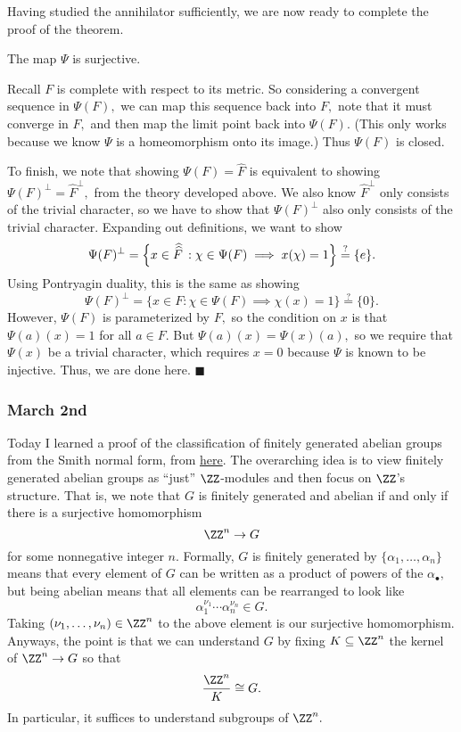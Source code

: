Having studied the annihilator sufficiently, we are now ready to complete the proof of the theorem.
\begin{lemma}
    The map $\Psi$ is surjective.
\end{lemma}
Recall $F$ is complete with respect to its metric. So considering a convergent sequence in $\Psi(F),$ we can map this sequence back into $F,$ note that it must converge in $F,$ and then map the limit point back into $\Psi(F).$ (This only works because we know $\Psi$ is a homeomorphism onto its image.) Thus $\Psi(F)$ is closed.

To finish, we note that showing $\Psi(F)=\widehat F$ is equivalent to showing $\Psi(F)^\perp=\widehat F^\perp,$ from the theory developed above. We also know $\widehat F^\perp$ only consists of the trivial character, so we have to show that $\Psi(F)^\perp$ also only consists of the trivial character. Expanding out definitions, we want to show
\[\Psi(F)^\perp=\Big\{x\in\widehat{\smash{\widehat F}\vphantom{1^]}\,}:\chi\in\Psi(F)\implies x(\chi)=1\Big\}\stackrel?=\{e\}.\]
Using Pontryagin duality, this is the same as showing
\[\Psi(F)^\perp=\{x\in F:\chi\in\Psi(F)\implies\chi(x)=1\}\stackrel?=\{0\}.\]
However, $\Psi(F)$ is parameterized by $F,$ so the condition on $x$ is that $\Psi(a)(x)=1$ for all $a\in F.$ But $\Psi(a)(x)=\Psi(x)(a),$ so we require that $\Psi(x)$ be a trivial character, which requires $x=0$ because $\Psi$ is known to be injective. Thus, we are done here. $\blacksquare$

\subsubsection{March 2nd}
Today I learned a proof of the classification of finitely generated abelian groups from the Smith normal form, from \href{https://www.cs.uleth.ca/~holzmann/notes/abelian.pdf}{here}. The overarching idea is to view finitely generated abelian groups as ``just'' $\ZZ$-modules and then focus on $\ZZ$'s structure. That is, we note that $G$ is finitely generated and abelian if and only if there is a surjective homomorphism
\[\ZZ^n\to G\]
for some nonnegative integer $n.$ Formally, $G$ is finitely generated by $\{\alpha_1,\ldots,\alpha_n\}$ means that every element of $G$ can be written as a product of powers of the $\alpha_\bullet,$ but being abelian means that all elements can be rearranged to look like
\[\alpha_1^{\nu_1}\cdots\alpha_n^{\nu_n}\in G.\]
Taking $(\nu_1,\ldots,\nu_n)\in\ZZ^n$ to the above element is our surjective homomorphism. Anyways, the point is that we can understand $G$ by fixing $K\subseteq\ZZ^n$ the kernel of $\ZZ^n\to G$ so that
\[\frac{\ZZ^n}K\cong G.\]
In particular, it suffices to understand subgroups of $\ZZ^n.$

